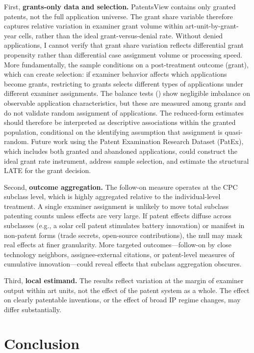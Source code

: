 \documentclass[12pt]{article}
\begin{document}
First, \textbf{grants-only data and selection.} PatentsView contains only granted patents, not the full application universe. The grant share variable therefore captures relative variation in examiner grant volume within art-unit-by-grant-year cells, rather than the ideal grant-versus-denial rate. Without denied applications, I cannot verify that grant share variation reflects differential grant propensity rather than differential case assignment volume or processing speed. More fundamentally, the sample conditions on a post-treatment outcome (grant), which can create selection: if examiner behavior affects which applications become grants, restricting to grants selects different types of applications under different examiner assignments. The balance tests () show negligible imbalance on observable application characteristics, but these are measured among grants and do not validate random assignment of applications. The reduced-form estimates should therefore be interpreted as descriptive associations within the granted population, conditional on the identifying assumption that assignment is quasi-random. Future work using the Patent Examination Research Dataset (PatEx), which includes both granted and abandoned applications, could construct the ideal grant rate instrument, address sample selection, and estimate the structural LATE for the grant decision.

Second, \textbf{outcome aggregation.} The follow-on measure operates at the CPC subclass level, which is highly aggregated relative to the individual-level treatment. A single examiner assignment is unlikely to move total subclass patenting counts unless effects are very large. If patent effects diffuse across subclasses (e.g., a solar cell patent stimulates battery innovation) or manifest in non-patent forms (trade secrets, open-source contributions), the null may mask real effects at finer granularity. More targeted outcomes---follow-on by close technology neighbors, assignee-external citations, or patent-level measures of cumulative innovation---could reveal effects that subclass aggregation obscures.

Third, \textbf{local estimand.} The results reflect variation at the margin of examiner output within art units, not the effect of the patent system as a whole. The effect on clearly patentable inventions, or the effect of broad IP regime changes, may differ substantially.


\section{Conclusion}
\end{document}
